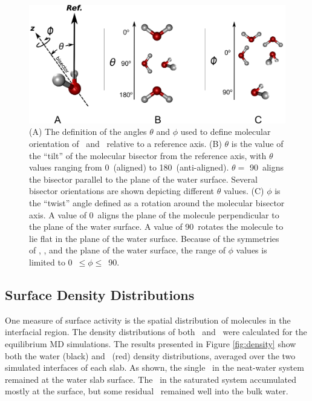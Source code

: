 \documentclass{article}
\begin{document}
\begin{figure}[h!]
	\begin{center}
		\includegraphics[scale=1.0]{molecular-angles-small.png}
		\caption{(A) The definition of the angles $\theta$ and $\phi$ used to define molecular orientation of \suldiox~and \wat~relative to a reference axis. (B) $\theta$ is the value of the ``tilt'' of the molecular bisector from the reference axis, with $\theta$ values ranging from  0\textdegree~(aligned) to 180\textdegree~(anti-aligned). $\theta = $ 90\textdegree~aligns the bisector parallel to the plane of the water surface. Several bisector orientations are shown depicting different $\theta$ values. (C) $\phi$ is the ``twist'' angle defined as a rotation around the molecular bisector axis. A value of 0\textdegree~aligns the plane of the molecule perpendicular to the plane of the water surface. A value of 90\textdegree~rotates the molecule to lie flat in the plane of the water surface. Because of the symmetries of \suldiox, \wat, and the plane of the water surface, the range of $\phi$ values is limited to 0\textdegree~$\leq \phi \leq$~90\textdegree.}
		\label{fig:water-angles}
	\end{center}
\end{figure}


\subsection{Surface Density Distributions}

One measure of surface activity is the spatial distribution of molecules in the interfacial region. The density distributions of both \wat~and \suldiox~were calculated for the equilibrium MD simulations. The results presented in Figure \ref{fig:density} show both the water (black) and \suldiox~(red) density distributions, averaged over the two simulated interfaces of each slab. As shown, the single \suldiox~in the neat-water system remained at the water slab surface. The \suldiox~in the saturated system accumulated mostly at the surface, but some residual \suldiox~remained well into the bulk water.
\end{document}
